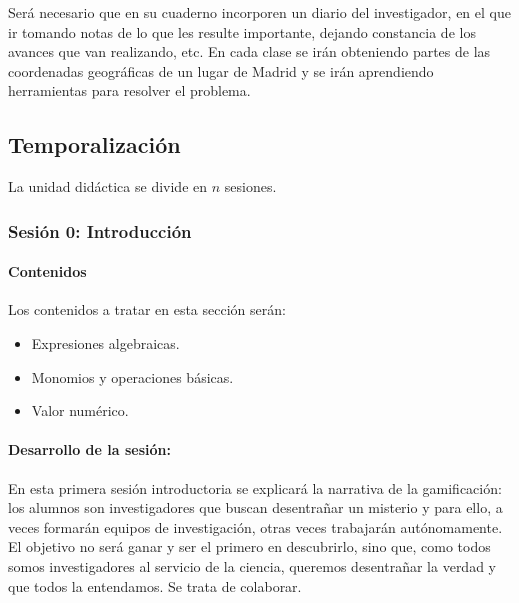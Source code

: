 Será necesario que en su cuaderno incorporen un diario del investigador, en el que ir tomando notas de lo que les resulte importante, dejando constancia de los avances que van realizando, etc.
%
En cada clase se irán obteniendo partes de las coordenadas geográficas de un lugar de Madrid y se irán aprendiendo herramientas para resolver el problema.




\subsection{Temporalización}

La unidad didáctica se divide en $n$ sesiones.

\subsubsection{Sesión 0: Introducción}


\paragraph{Contenidos}

Los contenidos a tratar en esta sección serán:
\begin{itemize}

\item Expresiones algebraicas.
\item Monomios y operaciones básicas.
\item Valor numérico.
\end{itemize}

\paragraph{Desarrollo de la sesión: }

En esta primera sesión introductoria se explicará la narrativa de la gamificación: 
%
los alumnos son investigadores que buscan desentrañar un misterio y para ello, a veces formarán equipos de investigación, otras veces trabajarán autónomamente.
%
El objetivo no será ganar y ser el primero en descubrirlo, sino que, como todos somos investigadores al servicio de la ciencia, queremos desentrañar la verdad y que todos la entendamos.
%
Se trata de colaborar.

